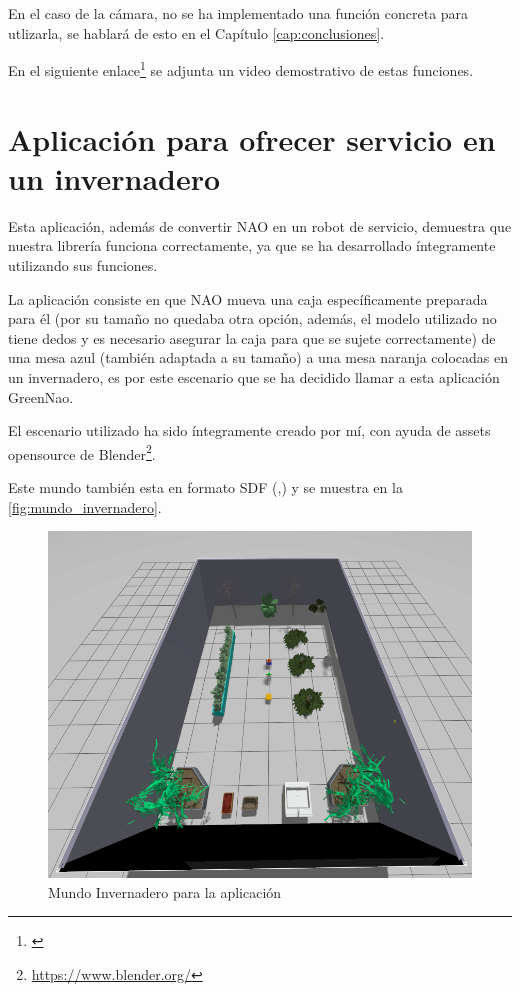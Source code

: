 En el caso de la cámara, no se ha implementado una función concreta para utlizarla, se hablará de esto en el Capítulo \ref{cap:conclusiones}. 

En el siguiente enlace\footnote{\url{}} se adjunta un video demostrativo de estas funciones.

\section{Aplicación para ofrecer servicio en un invernadero} \label{sec:aplicacion}

Esta aplicación, además de convertir NAO en un robot de servicio, demuestra que nuestra librería funciona correctamente, ya que se ha desarrollado íntegramente utilizando sus funciones.

La aplicación consiste en que NAO mueva una caja específicamente preparada para él (por su tamaño no quedaba otra opción, además, el modelo utilizado no tiene dedos y es necesario asegurar la caja para que se sujete correctamente) de una mesa azul (también adaptada a su tamaño) a una mesa naranja colocadas en un invernadero, es por este escenario que se ha decidido llamar a esta aplicación GreenNao.

El escenario utilizado ha sido íntegramente creado por mí, con ayuda de assets opensource de Blender\footnote{\url{https://www.blender.org/}}. 

Este mundo también esta en formato SDF (\cite{tutorial_mallas},\cite{parametros_fisicos_gazebo}) y se muestra en la \autoref{fig:mundo_invernadero}.

\begin{figure}[H]
  \centering
  \includegraphics[width=1\textwidth]{figures/cap_4/mundo_invernadero.png}
  \caption{Mundo Invernadero para la aplicación}
  \label{fig:mundo_invernadero}
\end{figure}

